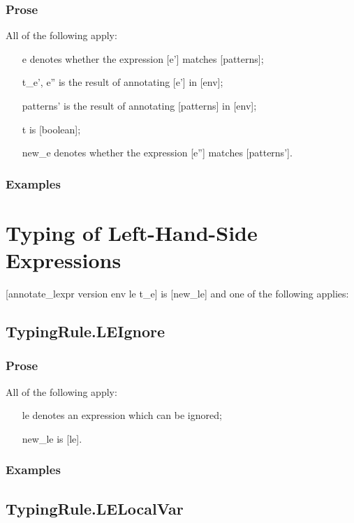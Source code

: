 \documentclass{book}
\begin{document}
  \subsubsection{Prose}
  All of the following apply:
  \begin{itemize}
  \item  [e] denotes whether the expression [e'] matches [patterns];
  \item  [t\_e', e''] is the result of annotating [e'] in [env];
  \item  [patterns'] is the result of annotating [patterns] in [env];
  \item  [t] is [boolean];
  \item  [new\_e] denotes whether the expression [e''] matches [patterns'].
  \end{itemize}

  \subsubsection{Examples}

\section{
Typing of Left-Hand-Side Expressions
}
[annotate\_lexpr version env le t\_e] is [new\_le] and one of the following
applies:

\subsection{TypingRule.LEIgnore}

   \subsubsection{Prose}
   All of the following apply:
   \begin{itemize}
   \item [le] denotes an expression which can be ignored;
   \item [new\_le] is [le].
   \end{itemize}

   \subsubsection{Examples}

\subsection{TypingRule.LELocalVar}
\end{document}
